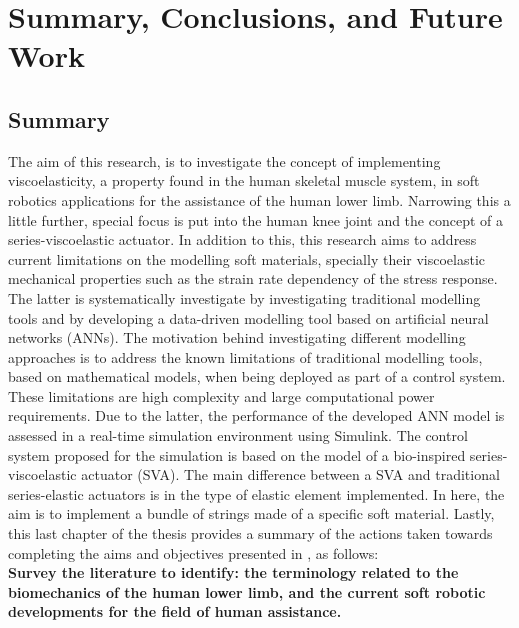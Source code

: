 \chapter{Summary, Conclusions, and Future Work}

\section{Summary}

The aim of this research, is to investigate the concept of implementing viscoelasticity, a property found in the human skeletal muscle system, in soft robotics applications for the assistance of the human lower limb. Narrowing this a little further, special focus is put into the human knee joint and the concept of a series-viscoelastic actuator. In addition to this, this research aims to address current limitations on the modelling soft materials, specially their viscoelastic mechanical properties such as the strain rate dependency of the stress response. The latter is systematically investigate by investigating traditional modelling tools and by developing a data-driven modelling tool based on artificial neural networks (ANNs). The motivation behind investigating different modelling approaches is to address the known limitations of traditional modelling tools, based on mathematical models, when being deployed as part of a control system. These limitations are high complexity and large computational power requirements. Due to the latter, the performance of the developed ANN model is assessed in a real-time simulation environment using Simulink. The control system proposed for the simulation is based on the model of a bio-inspired series-viscoelastic actuator (SVA). The main difference between a SVA and traditional series-elastic actuators is in the type of elastic element implemented. In here, the aim is to implement a bundle of strings made of a specific soft material. Lastly, this last chapter of the thesis provides a summary of the actions taken towards completing the aims and objectives presented in , as follows: 
\\[1em]
\noindent \textbf{ \large{ Survey the literature to identify: the terminology related to the biomechanics of the human lower limb, and the current soft robotic developments for the field of human assistance.}}

